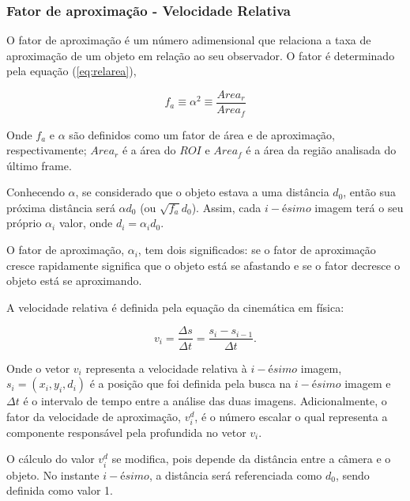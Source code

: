 \subsubsection{Fator de aproximação - Velocidade Relativa}

O fator de aproximação é um número adimensional que relaciona a taxa de 
aproximação de um objeto em relação ao seu observador.
O fator é determinado pela equação (\ref{eq:relarea}),

\begin{equation}\label{eq:relarea}
f_a \equiv \alpha^2 \equiv \frac{Area_r}{Area_f} 
\end{equation}

Onde $f_a$ e $\alpha$ são definidos como um fator de área e de aproximação,
respectivamente; $Area_r$ é a área do $ROI$ e $Area_f$ é a área da região analisada
do último frame.

Conhecendo $\alpha$, se considerado que o objeto estava a uma distância $d_0$, então
sua próxima distância será $\alpha d_0$ (ou $\sqrt{f_a} d_0$). Assim, cada $i-ésimo$ imagem
terá o seu próprio $\alpha_i$ valor, onde $d_i=\alpha_i d_0$.

O fator de aproximação, $\alpha_i$, tem dois significados: se o fator de aproximação cresce rapidamente 
significa que o objeto está se afastando e se o fator decresce o objeto está se aproximando.

A velocidade relativa é definida pela equação da cinemática em física:

\begin{equation}
 v_i = \frac{\Delta s}{\Delta t}= \frac{s_i-s_{i-1}}{\Delta t}.
\end{equation}

Onde o vetor $v_i$ representa a velocidade relativa à $i-ésimo$ imagem, $s_i=(x_i,y_i,d_i)$ é a posição que
foi definida pela busca na $i-ésimo$ imagem e $\Delta t$ é o intervalo de tempo entre a análise das duas imagens.
Adicionalmente, o fator da velocidade de aproximação, $v^d_i$, é o número escalar o qual representa a componente
responsável pela profundida no vetor $v_i$.

O cálculo do valor $v^d_i$ se modifica, pois depende da distância entre a câmera e o objeto. No instante $i-ésimo$,
a distância será referenciada como $d_0$, sendo definida como valor 1.
